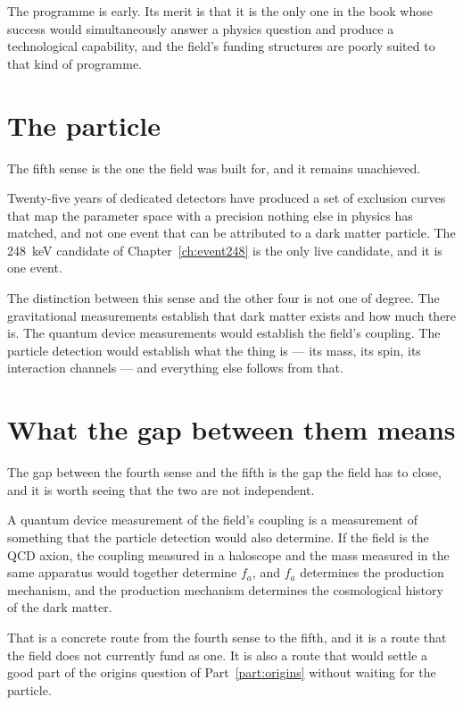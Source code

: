 The programme is early. Its merit is that it is the only one in the book
whose success would simultaneously answer a physics question and produce a
technological capability, and the field's funding structures are poorly
suited to that kind of programme.

\section{The particle}The fifth sense is the one the field was built for, and it
remains unachieved.

Twenty-five years of dedicated detectors have produced a set of exclusion
curves that map the parameter space with a precision nothing else in
physics has matched, and not one event that can be attributed to a dark
matter particle. The 248~keV candidate of Chapter~\ref{ch:event248} is the
only live candidate, and it is one event.

The distinction between this sense and the other four is not one of degree.
The gravitational measurements establish that dark matter exists and how
much there is. The quantum device measurements would establish the field's
coupling. The particle detection would establish what the thing is --- its
mass, its spin, its interaction channels --- and everything else follows
from that.

\section{What the gap between them means}The gap between the fourth sense and the
fifth is the gap the field has to close, and it is worth seeing that the two
are not independent.

A quantum device measurement of the field's coupling is a measurement of
something that the particle detection would also determine. If the field is
the QCD axion, the coupling measured in a haloscope and the mass measured
in the same apparatus would together determine $f_a$, and $f_a$ determines
the production mechanism, and the production mechanism determines the
cosmological history of the dark matter.

That is a concrete route from the fourth sense to the fifth, and it is a
route that the field does not currently fund as one. It is also a route that
would settle a good part of the origins question of Part~\ref{part:origins}
without waiting for the particle.


